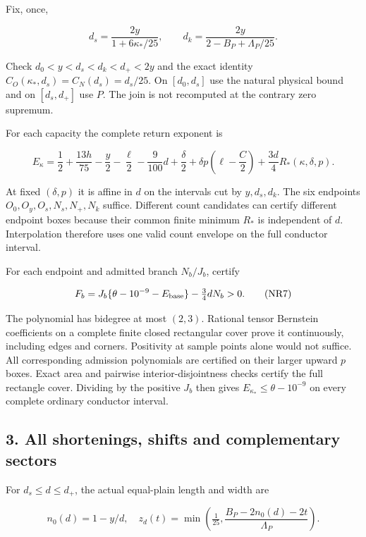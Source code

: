 Fix, once,

\[
 d_s=\frac{2y}{1+6\kappa_*/25},\qquad
 d_k=\frac{2y}{2-B_P+\Lambda_P/25}.
\tag{NR5}
\]

Check \(d_0<y<d_s<d_k<d_+<2y\) and the exact identity \(C_O(\kappa_*,d_s)=C_N(d_s)=d_s/25\). On \([d_0,d_s]\) use the natural physical bound and on \([d_s,d_+]\) use \(P\). The join is not recomputed at the contrary zero supremum.

For each capacity the complete return exponent is

\[
 E_\kappa=\frac12+\frac{13h}{75}-\frac y2-\frac\ell2
  -\frac9{100}d+\frac\delta2
  +\delta p\left(\ell-\frac C2\right)
  +\frac{3d}{4}R_*(\kappa,\delta,p).
\tag{NR6}
\]

At fixed \((\delta,p)\) it is affine in \(d\) on the intervals cut by \(y,d_s,d_k\). The six endpoints \(O_0,O_y,O_s,N_s,N_+,N_k\) suffice. Different count candidates can certify different endpoint boxes because their common finite minimum \(R_*\) is independent of \(d\). Interpolation therefore uses one valid count envelope on the full conductor interval.

For each endpoint and admitted branch \(N_b/J_b\), certify

\[
 F_b=J_b\{\theta-10^{-9}-E_{\rm base}\}
                   -\tfrac34dN_b>0.
\tag{NR7}
\]

The polynomial has bidegree at most \((2,3)\). Rational tensor Bernstein coefficients on a complete finite closed rectangular cover prove it continuously, including edges and corners. Positivity at sample points alone would not suffice. All corresponding admission polynomials are certified on their larger upward \(p\) boxes. Exact area and pairwise interior-disjointness checks certify the full rectangle cover. Dividing by the positive \(J_b\) then gives \(E_{\kappa_*}\le\theta-10^{-9}\) on every complete ordinary conductor interval.

\hypertarget{return:all-shortenings-shifts-and-complementary-sectors}{%
\subsection{3. All shortenings, shifts and complementary sectors}\label{return:all-shortenings-shifts-and-complementary-sectors}}

For \(d_s\le d\le d_+\), the actual equal-plain length and width are

\[
 n_0(d)=1-y/d,\quad
 z_d(t)=\min\left(\tfrac1{25},
       \frac{B_P-2n_0(d)-2t}{\Lambda_P}\right).
\tag{NR8}
\]

